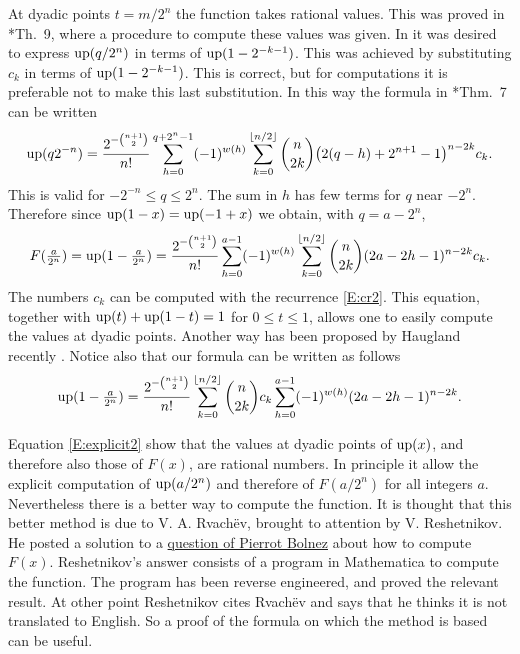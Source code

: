 \documentclass[10pt]{amsart}
\theoremstyle{definition}
\theoremstyle{remark}
\begin{document}
At dyadic points $t=m/2^n$  the function takes rational values. This was proved
in \cite{MR666839}*{Th.~9}, where a procedure to compute these values was given.
In \cite{MR666839} it was desired to express $\operatorname{up}(q/2^n)$ in terms of $\operatorname{up}(1-2^{-k-1})$.
This was achieved by substituting $c_k$ in terms of $\operatorname{up}(1-2^{-k-1})$. This is
correct, but for computations it is preferable not to make this last substitution.
In this way the formula in \cite{MR666839}*{Thm.~7} can be written
\[\operatorname{up}(q2^{-n})=\frac{2^{-\binom{n+1}{2}}}{n!}\sum_{h=0}^{q+2^n-1}(-1)^{w(h)}
\sum_{k=0}^{\lfloor n/2\rfloor}\binom{n}{2k}\bigl(2(q-h)+2^{n+1}-1\bigr)^{n-2k}c_k.\]
This is valid for $-2^{-n}\le q\le 2^n$.
The sum in $h$ has few terms for $q$ near $-2^{n}$.
Therefore since $\operatorname{up}(1-x)=\operatorname{up}(-1+x)$ we obtain, with $q=a-2^{n}$,
\begin{equation}\label{E:explicit}
F(\tfrac{a}{2^n})=\operatorname{up}(1-\tfrac{a}{2^n})=
\frac{2^{-\binom{n+1}{2}}}{n!}\sum_{h=0}^{a-1}(-1)^{w(h)}
\sum_{k=0}^{\lfloor n/2\rfloor}\binom{n}{2k}(2a-2h-1)^{n-2k}c_k.
\end{equation}
The numbers $c_k$ can be computed with the recurrence \eqref{E:cr2}.
This  equation, together with $\operatorname{up}(t)+\operatorname{up}(1-t)=1$ for $0\le t\le1$,  allows one to easily
compute the values at dyadic points.
Another way has been proposed by Haugland recently \cite{H}.
Notice also that our formula can be written as follows
\begin{equation}\label{E:explicit2}
\operatorname{up}(1-\tfrac{a}{2^n})=
\frac{2^{-\binom{n+1}{2}}}{n!}
\sum_{k=0}^{\lfloor n/2\rfloor}\binom{n}{2k}c_k
\sum_{h=0}^{a-1}(-1)^{w(h)}
(2a-2h-1)^{n-2k}.
\end{equation}

Equation \eqref{E:explicit2} show that the values at dyadic points of $\operatorname{up}(x)$, and therefore also those
of $F(x)$, are rational numbers. In principle it allow the explicit computation of $\operatorname{up}(a/2^n)$
and therefore of $F(a/2^n)$ for all integers $a$. Nevertheless there is a better way to compute the function.
It is thought that  this better method is due to V. A. Rvach{\"e}v,
brought to attention by V. Reshetnikov. He posted a solution to a
\href{http://mathematica.stackexchange.com/questions/120331/how-do-i-numerically-evaluate-and-plot-the-fabius-function}{question of Pierrot Bolnez} about how to compute $F(x)$.
Reshetnikov's answer consists of a program
in Mathematica to compute the function. The program has been reverse engineered,
and proved the
relevant result.  At other point Reshetnikov cites Rvach{\"e}v and  says that he thinks it is not
translated to English.  So a proof of the formula on which the method is based can be useful.
\end{document}
